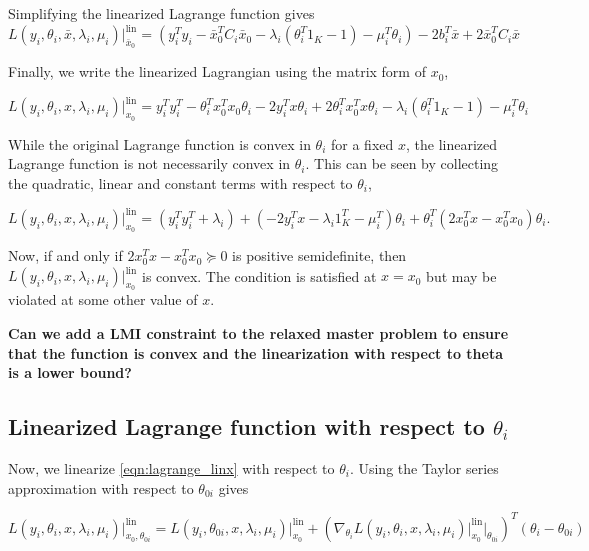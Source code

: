 \documentclass[11pt]{article}
\begin{document}
Simplifying the linearized Lagrange function gives
\begin{equation}\label{eqn:lagrange_linx}
L(y_i, \theta_i, \bar{x}, \lambda_i, \mu_i) \bigg|^{\text{lin}}_{\bar{x}_0} = (y_i^T y_i - \bar{x}_0^T C_i \bar{x}_0 - \lambda_i(\theta_i^T 1_K - 1) - \mu_i^T \theta_i) - 2 b_i^T \bar{x} + 2 \bar{x}_0^T C_i \bar{x}
\end{equation}

Finally, we write the linearized Lagrangian using the matrix form of $x_0$,

\begin{equation}
L(y_i, \theta_i, x, \lambda_i, \mu_i) \bigg|^{\text{lin}}_{x_0} = 
y_i^T y_i^T - \theta_i^T x_0^T x_0 \theta_i - 2 y_i^T x \theta_i + 2 \theta_i^T x_0^T x \theta_i - \lambda_i(\theta_i^T 1_K - 1) - \mu_i^T \theta_i
\end{equation}

While the original Lagrange function is convex in $\theta_i$ for a fixed $x$, the linearized Lagrange function is not necessarily convex in $\theta_i$. This can be seen by collecting the quadratic, linear and constant terms with respect to $\theta_i$,

\begin{equation}
L(y_i, \theta_i, x, \lambda_i, \mu_i) \bigg|^{\text{lin}}_{x_0} = 
(y_i^T y_i^T + \lambda_i) + (- 2 y_i^T x -\lambda_i 1_K^T -\mu_i^T ) \theta_i + \theta_i^T (2 x_0^T x - x_0^T x_0 ) \theta_i.
\end{equation}

Now, if and only if $2x_0^Tx - x_0^Tx_0 \succeq 0$ is positive semidefinite, then $L(y_i, \theta_i, x, \lambda_i, \mu_i) \bigg|^{\text{lin}}_{x_0}$ is convex. The condition is satisfied at $x = x_0$ but may be violated at some other value of $x$. 

\textbf{Can we add a LMI constraint to the relaxed master problem to ensure that the function is convex and the linearization with respect to theta is a lower bound?}

\subsection{Linearized Lagrange function with respect to $\theta_i$}
Now, we linearize \eqref{eqn:lagrange_linx} with respect to $\theta_i$. Using the Taylor series approximation with respect to $\theta_{0i}$ gives

\begin{equation}
L(y_i, \theta_i, x, \lambda_i, \mu_i) \bigg|^{\text{lin}}_{x_0, \theta_{0i}} = L(y_i, \theta_{0i}, x, \lambda_i, \mu_i) \bigg|^{\text{lin}}_{x_0} + \left( \nabla_{\theta_i} L(y_i, \theta_i, x, \lambda_i, \mu_i) \bigg|^{\text{lin}}_{x_0} \bigg|_{\theta_{0i}} \right)^T (\theta_i - \theta_{0i})
\end{equation}
\end{document}
